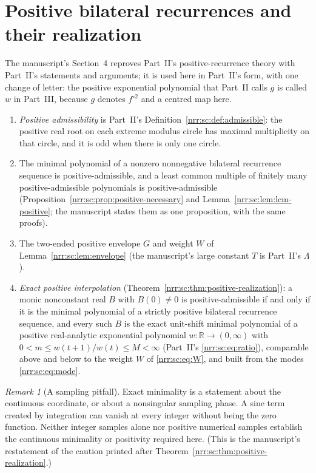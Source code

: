 \documentclass[11pt,letterpaper]{article}
\theoremstyle{definition}
\theoremstyle{remark}
\newtheorem{remark}[theorem]{Remark}
\newcommand{\R}{\mathbb R}
\begin{document}
\section{Positive bilateral recurrences and their realization}
\label{nrr:dc:sec:positive}

The manuscript's Section~4 reproves Part~II's positive-recurrence theory with
Part~II's statements and arguments; it is used here in Part~II's form, with
one change of letter: the positive exponential polynomial that Part~II calls
$g$ is called $w$ in Part~III, because $g$ denotes $f^{\circ2}$ and a centred
map here.
\begin{enumerate}[label=\textnormal{(\arabic*)},leftmargin=2.2em]
\item \emph{Positive admissibility} is Part~II's
Definition~\ref{nrr:sc:def:admissible}: the positive real root on each
extreme modulus circle has maximal multiplicity on that circle, and it is odd
when there is only one circle.
\item The minimal polynomial of a nonzero nonnegative bilateral recurrence
sequence is positive-admissible, and a least common multiple of finitely many
positive-admissible polynomials is positive-admissible
(Proposition~\ref{nrr:sc:prop:positive-necessary} and
Lemma~\ref{nrr:sc:lem:lcm-positive}; the manuscript states them as one
proposition, with the same proofs).
\item The two-ended positive envelope $G$ and weight $W$ of
Lemma~\ref{nrr:sc:lem:envelope} (the manuscript's large constant $T$ is
Part~II's $\Lambda$).
\item \emph{Exact positive interpolation}
(Theorem~\ref{nrr:sc:thm:positive-realization}): a monic nonconstant real $B$
with $B(0)\ne0$ is positive-admissible if and only if it is the minimal
polynomial of a strictly positive bilateral recurrence sequence, and every
such $B$ is the exact unit-shift minimal polynomial of a positive
real-analytic exponential polynomial $w:\R\to(0,\infty)$ with
$0<m\le w(t+1)/w(t)\le M<\infty$ (Part~II's \eqref{nrr:sc:eq:ratio}),
comparable above and below to the weight $W$ of \eqref{nrr:sc:eq:W}, and
built from the modes \eqref{nrr:sc:eq:mode}.
\end{enumerate}

\begin{remark}[A sampling pitfall]
Exact minimality is a statement about the continuous coordinate, or
about a nonsingular sampling phase. A sine term created by integration
can vanish at every integer without being the zero function. Neither
integer samples alone nor positive numerical samples establish the
continuous minimality or positivity required here. (This is the manuscript's
restatement of the caution printed after
Theorem~\ref{nrr:sc:thm:positive-realization}.)
\end{remark}
\end{document}
